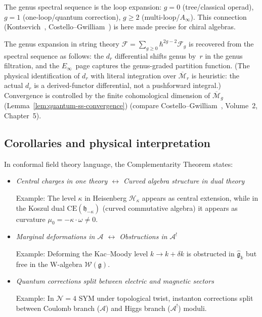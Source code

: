 \begin{remark}\label{rem:ss-feynman}
The genus spectral sequence is the loop expansion: $g=0$ (tree/classical
operad), $g=1$ (one-loop/quantum correction), $g\geq 2$
(multi-loop/$A_\infty$).
This connection (Kontsevich~\cite{Kon99},
Costello--Gwilliam~\cite{CG17}) is here made precise for chiral algebras.
\end{remark}

\begin{remark}\label{rem:genus-spectral-connection}
The genus expansion in string theory $\mathcal{F} = \sum_{g \geq 0} \hbar^{2g-2} \mathcal{F}_g$ is recovered from the spectral sequence as follows: the $d_r$ differential shifts genus by~$r$ in the genus filtration, and the $E_\infty$~page captures the genus-graded partition function.  (The physical identification of $d_r$ with literal integration over $\overline{\mathcal{M}}_r$ is heuristic: the actual $d_r$ is a derived-functor differential, not a pushforward integral.)  Convergence is controlled by the finite cohomological dimension of $\overline{\mathcal{M}}_g$ (Lemma~\ref{lem:quantum-ss-convergence}) (compare Costello--Gwilliam~\cite{CG17}, Volume~2, Chapter~5).
\end{remark}

\subsection{Corollaries and physical interpretation}

\begin{conjecture}
\label{conj:physical-complementarity}
In conformal field theory language, the Complementarity Theorem states:
\begin{itemize}
\item \emph{Central charges in one theory $\leftrightarrow$ Curved algebra structure 
in dual theory}
   
   Example: The level $\kappa$ in Heisenberg $\mathcal{H}_\kappa$ appears as central
extension, while in the Koszul dual $\mathrm{CE}(\mathfrak{h}_{-\kappa})$ (curved commutative algebra) it appears as curvature $\mu_0 = -\kappa \cdot \omega
\neq 0$.

\item \emph{Marginal deformations in $\mathcal{A}$ $\leftrightarrow$ Obstructions 
in $\mathcal{A}^!$}
   
   Example: Deforming the Kac--Moody level $k \to k + \delta k$ is obstructed in 
$\widehat{\mathfrak{g}}_k$ but free in the W-algebra $\mathcal{W}(\mathfrak{g})$.

\item \emph{Quantum corrections split between electric and magnetic sectors}
   
   Example: In $\mathcal{N}=4$ SYM under topological twist, instanton corrections 
split between Coulomb branch ($\mathcal{A}$) and Higgs branch ($\mathcal{A}^!$) 
moduli.
\end{itemize}
\end{conjecture}

